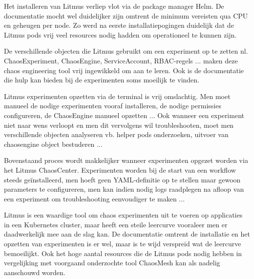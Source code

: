 Het installeren van Litmus verliep vlot via de package manager Helm. De documentatie mocht wel duidelijker zijn omtrent de minimum vereisten qua CPU en geheugen per node. Zo werd na eerste installatiepogingen duidelijk dat de Litmus pods vrij veel resources nodig hadden om operationeel te kunnen zijn.   

De verschillende objecten die Litmus gebruikt om een experiment op te zetten nl. ChaosExperiment, ChaosEngine, ServiceAccount, RBAC-regels ... maken deze chaos engineering tool vrij ingewikkeld om aan te leren. Ook is de documentatie die hulp kan bieden bij de experimenten soms moeilijk te vinden. 

Litmus experimenten opzetten via de terminal is vrij omslachtig. Men moet manueel de nodige experimenten vooraf installeren, de nodige permissies configureren, de ChaosEngine manueel opzetten ...
Ook wanneer een experiment niet naar wens verloopt en men dit vervolgens wil troubleshooten, moet men verschillende objecten analyseren vb. helper pods onderzoeken, uitvoer van chaosengine object bestuderen ... 

Bovenstaand proces wordt makkelijker wanneer experimenten opgezet worden via het Litmus ChaosCenter. Experimenten worden bij de start van een workflow steeds geïnstalleerd, men hoeft geen YAML-definitie op te stellen maar gewoon parameters te configureren, men kan indien nodig logs raadplegen na afloop van een experiment om troubleshooting eenvoudiger te maken ...

Litmus is een waardige tool om chaos experimenten uit te voeren op applicaties in een Kubernetes cluster, maar heeft een steile leercurve vooraleer men er daadwerkelijk mee aan de slag kan. De documentatie omtrent de installatie en het opzetten van experimenten is er wel, maar is te wijd verspreid wat de leercurve bemoeilijkt. Ook het hoge aantal resources die de Litmus pods nodig hebben in vergelijking met voorgaand onderzochte tool ChaosMesh kan als nadelig aanschouwd worden.   